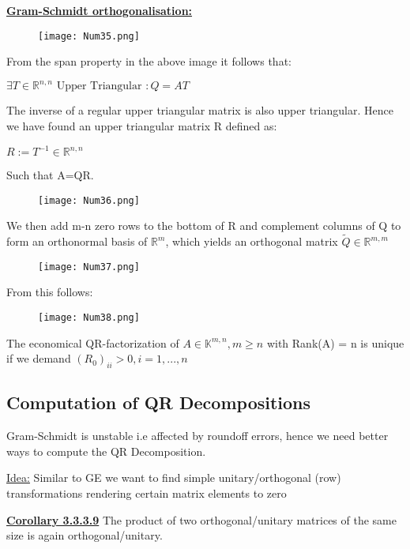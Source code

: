 \documentclass[8pt]{extreport}
\begin{document}
\underline{\textbf{Gram-Schmidt orthogonalisation:}}
\begin{figure}[H]
\centering
\texttt{[image: Num35.png]}
\end{figure}

From the span property in the above image it follows that:
\begin{center}
$\exists T \in \mathbb{R}^{n,n} \text{ Upper Triangular }: Q = AT$
\end{center}
The inverse of a regular upper triangular matrix is also upper triangular. Hence we have found an upper triangular matrix R defined as:
\begin{center}
$R:= T^{-1} \in \mathbb{R}^{n,n}$
\end{center}
Such that A=QR.
\begin{figure}[H]
\centering
\texttt{[image: Num36.png]}
\end{figure}
We then add m-n zero rows to the bottom of R and complement columns of Q to form an orthonormal basis of $\mathbb{R}^m$, which yields an orthogonal matrix $\tilde{Q} \in \mathbb{R}^{m,m}$
\begin{figure}[H]
\centering
\texttt{[image: Num37.png]}
\end{figure}
From this follows:
\begin{figure}[H]
\centering
\texttt{[image: Num38.png]}
\end{figure}
The economical QR-factorization of $A \in \mathbb{K}^{m,n}, m\geq n$ with Rank(A) = n is unique if we demand $(R_0)_{ii} > 0, i=1,...,n$

\subsection{Computation of QR Decompositions}

Gram-Schmidt is unstable i.e affected by roundoff errors, hence we need better ways to compute the QR Decomposition.

\underline{Idea:} Similar to GE we want to find simple unitary/orthogonal (row) transformations rendering certain matrix elements to zero

\underline{\textbf{Corollary 3.3.3.9}} The product of two orthogonal/unitary matrices of the same size is again orthogonal/unitary.
\end{document}
